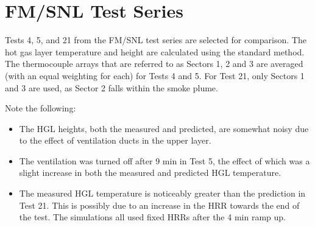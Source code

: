\clearpage

\section{FM/SNL Test Series}

Tests 4, 5, and 21 from the FM/SNL test series are selected for comparison. The hot gas layer temperature and height are calculated using the
standard method. The thermocouple arrays that are referred to as Sectors 1, 2 and 3 are averaged (with an equal weighting for each) for Tests 4 and
5. For Test 21, only Sectors 1 and 3 are used, as Sector 2 falls within the smoke plume.

Note the following:
\begin{itemize}
\item The HGL heights, both the measured and predicted, are somewhat noisy due to the effect of ventilation ducts in the upper layer.
\item The ventilation was turned off after 9 min in Test 5,
the effect of which was a slight increase in both the measured and predicted HGL temperature.
\item The measured HGL temperature is noticeably greater than the prediction in Test 21.
This is possibly due to an increase in the HRR towards the end of the test.  The simulations all used fixed HRRs after the 4 min ramp up.
\end{itemize}

